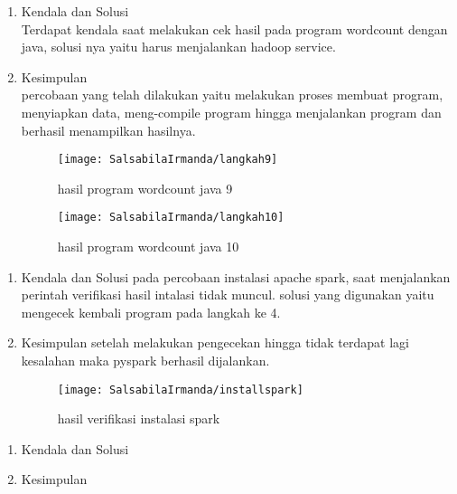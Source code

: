 \begin{enumerate}
\item Kendala dan Solusi \\
Terdapat kendala saat melakukan cek hasil pada program wordcount dengan java, solusi nya yaitu harus menjalankan hadoop service. 

\item Kesimpulan \\
percobaan yang telah dilakukan yaitu melakukan proses membuat program, menyiapkan data, meng-compile program hingga menjalankan program dan berhasil menampilkan hasilnya.

\begin{figure}[!ht]
\texttt{[image: SalsabilaIrmanda/langkah9]}
\caption{hasil program wordcount java 9}
\label{gam:hasil}
\end{figure}

\begin{figure}[!ht]
\texttt{[image: SalsabilaIrmanda/langkah10]}
\caption{hasil program wordcount java 10}
\label{gam:hasil}
\end{figure}
\end{enumerate}

\newpage
{}
\begin{enumerate}
\item Kendala dan Solusi
\newline pada percobaan instalasi apache spark, saat menjalankan perintah verifikasi hasil intalasi tidak muncul. solusi yang digunakan yaitu mengecek kembali program pada langkah ke 4.

\item Kesimpulan
setelah melakukan pengecekan hingga tidak terdapat lagi kesalahan maka pyspark berhasil dijalankan.
\begin{figure}[!ht]
\texttt{[image: SalsabilaIrmanda/installspark]}
\caption{hasil verifikasi instalasi spark}
\label{gam:hasil}
\end{figure}
\end{enumerate}

\begin{enumerate}
\item Kendala dan Solusi

\item Kesimpulan

\end{enumerate}